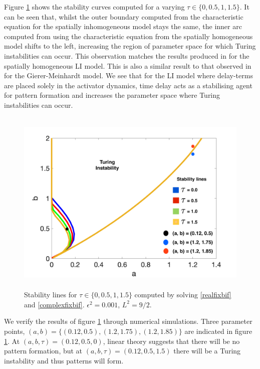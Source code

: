 Figure \ref{fig:tspacetau} shows the stability curves computed for a varying $\tau\in\{0,0.5,1,1.5\}$. It can be seen that, whilst the outer boundary computed from the characteristic equation for the spatially inhomogeneous model stays the same, the inner arc computed from using the characteristic equation from the spatially homogeneous model shifts to the left, increasing the region of parameter space for which Turing instabilities can occur. This observation matches the results produced in \cite{william} for the spatially homogeneous LI model. This is also a similar result to that observed in \cite{fadai2} for the Gierer-Meinhardt model. We see that for the LI model where delay-terms are placed solely in the activator dynamics, time delay acts as a stabilising agent for pattern formation and increases the parameter space where Turing instabilities can occur.
\begin{figure}[H]
        \centering
        \includegraphics[width=12cm,height = 9cm]{tspacetau.png}
        \caption{Stability lines for $\tau\in\{0,0.5,1,1.5\}$ computed by solving \eqref{realfixbif} and \eqref{complexfixbif}. $\epsilon^2=0.001$, $L^2=9/2$.}
        \label{fig:tspacetau}
\end{figure}
We verify the results of figure \ref{fig:tspacetau} through numerical simulations. Three parameter points, $(a,b)=\{(0.12,0.5),(1.2,1.75),(1.2,1.85)\}$ are indicated in figure \ref{fig:tspacetau}. At $(a,b,\tau)=(0.12,0.5,0)$, linear theory suggests that there will be no pattern formation, but at $(a,b,\tau)=(0.12,0.5,1.5)$ there will be a Turing instability and thus patterns will form.
